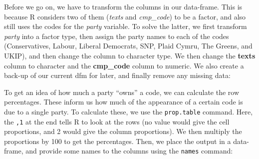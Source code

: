 \documentclass[
]{book}
\newenvironment{Shaded}{\begin{snugshade}}{\end{snugshade}}
\newcommand{\AttributeTok}[1]{\textcolor[rgb]{0.13,0.29,0.53}{#1}}
\newcommand{\DecValTok}[1]{\textcolor[rgb]{0.00,0.00,0.81}{#1}}
\newcommand{\FunctionTok}[1]{\textcolor[rgb]{0.13,0.29,0.53}{\textbf{#1}}}
\newcommand{\NormalTok}[1]{#1}
\newcommand{\OtherTok}[1]{\textcolor[rgb]{0.56,0.35,0.01}{#1}}
\newcommand{\SpecialCharTok}[1]{\textcolor[rgb]{0.81,0.36,0.00}{\textbf{#1}}}
\newcommand{\StringTok}[1]{\textcolor[rgb]{0.31,0.60,0.02}{#1}}
\begin{document}
Before we go on, we have to transform the columns in our data-frame. This is because R considers two of them (\emph{texts} and \emph{cmp\_code}) to be a factor, and also still uses the codes for the \emph{party} variable. To solve the latter, we first transform \emph{party} into a factor type, then assign the party names to each of the codes (Conservatives, Labour, Liberal Democrats, SNP, Plaid Cymru, The Greens, and UKIP), and then change the column to character type. We then change the \textbf{texts} column to character and the \textbf{cmp\_code} column to numeric. We also create a back-up of our current dfm for later, and finally remove any missing data:

\begin{Shaded}
\end{Shaded}

To get an idea of how much a party ``owns'' a code, we can calculate the row percentages. These inform us how much of the appearance of a certain code is due to a single party. To calculate these, we use the \texttt{prop.table} command. Here, the \texttt{,1} at the end tells R to look at the rows (no value would give the cell proportions, and 2 would give the column proportions). We then multiply the proportions by 100 to get the percentages. Then, we place the output in a data-frame, and provide some names to the columns using the \texttt{names} command:
\end{document}
